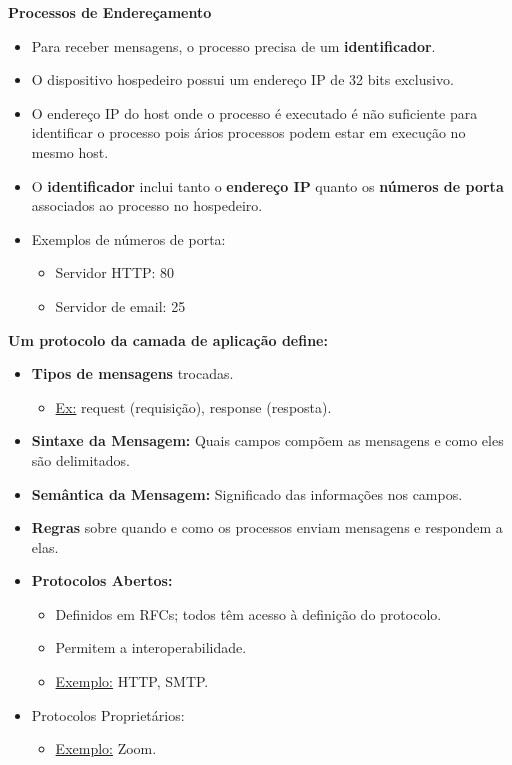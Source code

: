     \textbf{Processos de Endereçamento}
    \begin{itemize}[left=0.5cm, align=left, nosep]    
        \item Para receber mensagens, o processo precisa de um \textbf{identificador}.
        \item O dispositivo hospedeiro possui um endereço IP de 32 bits exclusivo.
        \item O endereço IP do host onde o processo é executado é não suficiente para identificar 
        o processo pois ários processos podem estar em execução no mesmo host.
        \item O \textbf{identificador} inclui tanto o \textbf{endereço IP} quanto os \textbf{números de porta} associados ao processo no hospedeiro.
        \item Exemplos de números de porta:
        \begin{itemize}[left=0.5cm, nosep, label=$\hookrightarrow$]
            \item Servidor HTTP: 80
            \item Servidor de email: 25
        \end{itemize}  
    \end{itemize}  

    \textbf{Um protocolo da camada de aplicação define:}
    \begin{itemize}[left=0.5cm, align=left, nosep]    
        \item \textbf{Tipos de mensagens} trocadas.
        \begin{itemize}[left=0.5cm, nosep, label=$\hookrightarrow$]
            \item \underline{Ex:} request (requisição), response (resposta).
        \end{itemize}  
        \item \textbf{Sintaxe da Mensagem:} Quais campos compõem as mensagens e como eles são delimitados.
        \item \textbf{Semântica da Mensagem:} Significado das informações nos campos.
        \item \textbf{Regras} sobre quando e como os processos enviam mensagens e respondem a elas.
        \item \textbf{Protocolos Abertos:}
        \begin{itemize}[left=0.5cm, nosep, label=$\hookrightarrow$]
            \item Definidos em RFCs; todos têm acesso à definição do protocolo.
            \item Permitem a interoperabilidade.
            \item \underline{Exemplo:} HTTP, SMTP.
        \end{itemize} 
        \item Protocolos Proprietários:
        \begin{itemize}[left=0.5cm, nosep, label=$\hookrightarrow$]
            \item \underline{Exemplo:} Zoom.
        \end{itemize} 
    \end{itemize}

